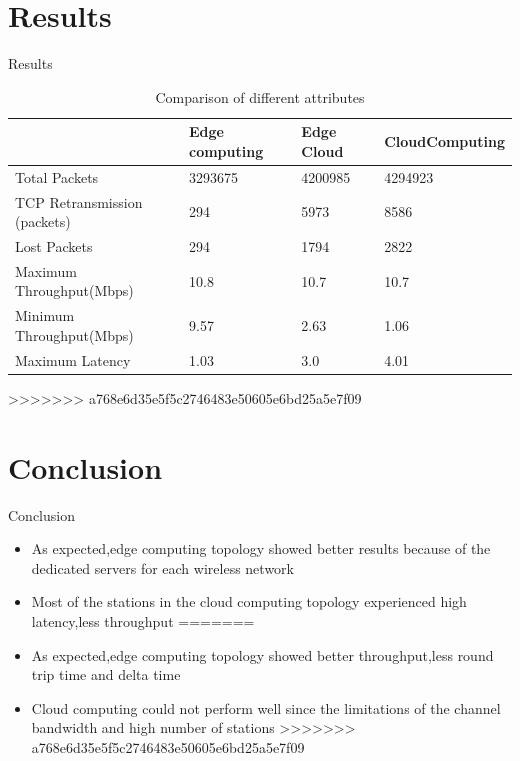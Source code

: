 \documentclass{beamer}
\begin{document}
\section{Results}
\begin{frame}{Results}
\begin{table}[h!]
\begin{center}
\caption{Comparison of different attributes}
\label{tab:table1}
\begin{tabular}{ |p{2.9cm}|p{2.5cm}|p{2cm}|p{2.5cm}|  }
 \hline
  & Edge \newline computing & Edge \newline Cloud & Cloud\newline Computing\\ 
 \hline
 Total Packets & 3293675 & 4200985 & 4294923\\
 \hline
 TCP \newline Retransmission \newline(packets)  & 294 & 5973 &8586\\
 \hline
 Lost Packets & 294 & 1794 & 2822 \\ 
 \hline
 Maximum \newline Throughput(Mbps) & 10.8 & 10.7 & 10.7\\
 \hline 
 Minimum \newline Throughput(Mbps) & 9.57 & 2.63 & 1.06 \\
 \hline
 Maximum \newline Latency & 1.03 & 3.0 &4.01 \\
 \hline
\end{tabular}
\end{center}
\end{table}

\end{frame}


>>>>>>> a768e6d35e5f5c2746483e50605e6bd25a5e7f09
\section{Conclusion}

\begin{frame}{Conclusion}
\begin{itemize}
<<<<<<< HEAD
	\item As expected,edge computing topology showed better results because of the dedicated servers for each wireless network
	\item Most of the stations in the cloud computing topology experienced high latency,less throughput 
=======
	\item As expected,edge computing topology showed better throughput,less round trip time and delta time
	\item Cloud computing could not perform well since the limitations of the channel bandwidth and high number of stations
>>>>>>> a768e6d35e5f5c2746483e50605e6bd25a5e7f09
\end{itemize}
\end{frame}
\end{document}
